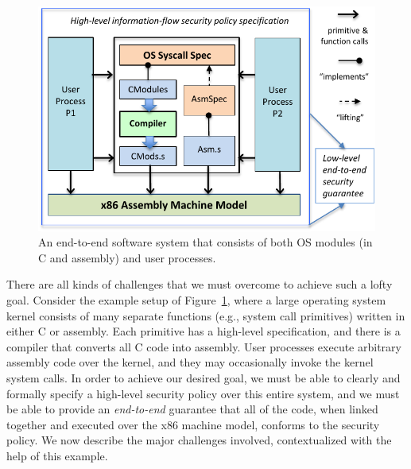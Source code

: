 \begin{figure}[t]
\begin{center}
\includegraphics[scale=0.685]{pldi/figure/osmach2}
\caption{\small An end-to-end software system that consists 
of both OS modules (in C and assembly) and user processes.}
\label{fig:osmach}
\end{center}
\end{figure}

There are all kinds of challenges that we must overcome to achieve 
such a lofty goal. Consider the example setup of 
Figure~\ref{fig:osmach}, where a large operating system kernel
consists of many separate functions (e.g., system call primitives) 
written in either C or assembly. Each primitive has a
high-level specification, and there is a compiler that converts
all C code into assembly. User processes execute arbitrary 
assembly code over the kernel, and they may occasionally 
invoke the kernel system calls. In order to achieve our desired 
goal, we must be able to clearly and formally specify a high-level
security policy over this entire system, and we must be able to
provide an \emph{end-to-end} guarantee that all of the code,
when linked together and executed over the x86 machine model,
conforms to the security policy. We now describe the major
challenges involved, contextualized with the help of this example.

